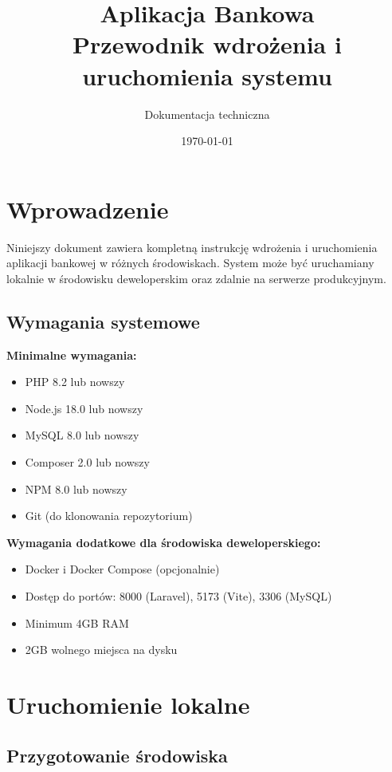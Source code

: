\documentclass[12pt,a4paper]{article}
\title{\textbf{Aplikacja Bankowa}\\[0.5cm]\Large Przewodnik wdrożenia i uruchomienia systemu}
\author{Dokumentacja techniczna}
\date{\today}
\begin{document}
    \maketitle
    \thispagestyle{empty}

    \newpage
    \tableofcontents
    \newpage

    \section{Wprowadzenie}

    Niniejszy dokument zawiera kompletną instrukcję wdrożenia i uruchomienia aplikacji bankowej w różnych środowiskach. System może być uruchamiany lokalnie w środowisku deweloperskim oraz zdalnie na serwerze produkcyjnym.

    \subsection{Wymagania systemowe}

    \textbf{Minimalne wymagania:}
    \begin{itemize}
        \item PHP 8.2 lub nowszy
        \item Node.js 18.0 lub nowszy
        \item MySQL 8.0 lub nowszy
        \item Composer 2.0 lub nowszy
        \item NPM 8.0 lub nowszy
        \item Git (do klonowania repozytorium)
    \end{itemize}

    \textbf{Wymagania dodatkowe dla środowiska deweloperskiego:}
    \begin{itemize}
        \item Docker i Docker Compose (opcjonalnie)
        \item Dostęp do portów: 8000 (Laravel), 5173 (Vite), 3306 (MySQL)
        \item Minimum 4GB RAM
        \item 2GB wolnego miejsca na dysku
    \end{itemize}

    \section{Uruchomienie lokalne}

    \subsection{Przygotowanie środowiska}
\end{document}
